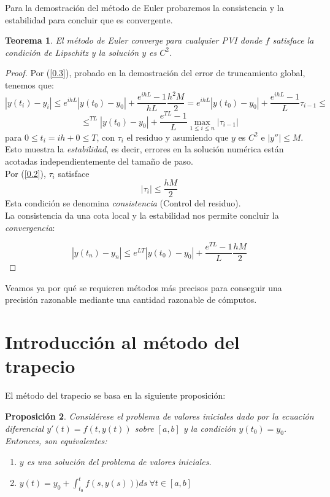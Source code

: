 \documentclass{article}
\theoremstyle{theorem-style}  %
\newtheorem{theorem}{Teorema}[section]  %
\newtheorem{proposition}[theorem]{Proposición}
\theoremstyle{definition}
\theoremstyle{example-style}
\begin{document}
	Para la demostración del método de Euler probaremos la consistencia y la estabilidad para concluir que es convergente.
	
	\begin{theorem}
		El método de Euler converge para cualquier PVI donde $f$ satisface la condición de Lipschitz y la solución $y$ es $C^2$.
	\end{theorem}
	
	\begin{proof}
		Por (\ref{0.3}), probado en la demostración del error de truncamiento global, tenemos que:
		$$|y(t_i)-y_i| \le e^{ihL}|y(t_0)-y_0|+\frac{e^{ihL}-1}{hL}\frac{h^2M}{2} = e^{ihL}|y(t_0)-y_0|+\frac{e^{ihL}-1}{L}\tau_{i-1} \le $$ $$ \le^{TL}|y(t_0)-y_0|+\frac{e^{TL}-1}{L}\max_{1 \le i \le n} |\tau_{i-1}|$$
		para $0 \le t_i=ih+0 \le T$, con $\tau_i$ el residuo y asumiendo que $y$ es $C^2$ e $|y''| \le M$. Esto muestra la \textit{estabilidad}, es decir, errores en la solución numérica están acotadas independientemente del tamaño de paso.\\
		
		Por (\ref{0.2}), $\tau_i$ satisface
		$$|\tau_i|\le \frac{hM}{2}$$
		Esta condición se denomina \textit{consistencia} (Control del residuo).\\
		
		La consistencia da una cota local y la estabilidad nos permite concluir la \textit{convergencia}:
		
		$$|y(t_n)-y_n| \le e^{LT}|y(t_0)-y_0|+\frac{e^{TL}-1}{L}\frac{hM}{2}$$ 
	\end{proof}
	
	Veamos ya por qué se requieren métodos más precisos para conseguir una precisión razonable mediante una cantidad razonable de cómputos.
	

\section{Introducción al método del trapecio} \label{sec:intro-trapecio}

	El método del trapecio se basa en la siguiente proposición:

	\begin{proposition} \label{prop:sol-eq}
		Considérese el problema de valores iniciales dado por la ecuación diferencial $y'(t) = f(t,y(t))$ sobre $[a,b]$ y la condición $y(t_0) = y_0$.  Entonces, son equivalentes:
		\begin{enumerate}
			\item $y$ es una solución del problema de valores iniciales.
			\item $y(t) = y_0 + \int_{t_0}^{t} f(s,y(s))) ds \ \forall t \in [a,b]$
		\end{enumerate}
	\end{proposition}
	
\end{document}
